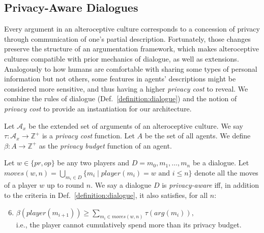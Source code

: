 \documentclass[acmsmall]{custom-arxiv}  %
\begin{document}
\subsection{Privacy-Aware Dialogues}
Every argument in an alteroceptive culture corresponds to a concession of privacy through communication of one's partial description. Fortunately, those changes preserve the structure of an argumentation framework, which makes alteroceptive cultures compatible with prior mechanics of dialogue, as well as extensions. Analogously to how humans are comfortable with sharing some types of personal information but not others, some features in agents' descriptions might be considered more sensitive, and thus having a higher \textit{privacy cost} to reveal. We combine the rules of dialogue (Def.~\ref{definition:dialogue}) and the notion of \textit{privacy cost} to provide an instantiation for our architecture. 

\begin{definition} 
Let $\mathcal{A}_x$ be the extended set of arguments of an alteroceptive culture. We say $\tau: \mathcal{A}_x \rightarrow \mathbb{Z}^+$ is a \textit{privacy cost} function. Let $A$ be the set of all agents. We define $\beta: A \rightarrow \mathbb{Z}^+$ as the \textit{privacy budget} function of an agent.
\end{definition}

\begin{definition} 
Let $w \in \{pr, op\}$ be any two players and $D = m_0,m_1,\dots,m_n$ be a dialogue. Let $moves(w, n) = \bigcup\limits_{m_i \in D}\{m_i \mid \textit{player}(m_i) = w \text{ and } i \leq n\}$ denote all the moves of a player $w$ up to round $n$. We say a dialogue $D$ is \textit{privacy-aware} iff, in addition to the criteria in Def.~\ref{definition:dialogue}, it also satisfies, for all $n$:
\begin{enumerate}
\setcounter{enumi}{5}
    \item $\beta(\textit{player}(m_{i+1})) \geq \sum\limits_{m_i \in moves(w, n)} \tau(\textit{arg}(m_i)),$ \\i.e., the player cannot cumulatively spend more than its privacy budget.
\end{enumerate}

\end{definition}
\end{document}
